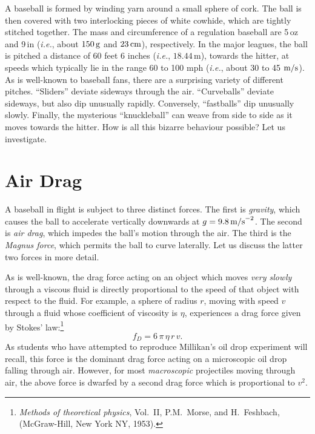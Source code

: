 A baseball is formed by winding yarn  around a small sphere of cork.
The ball is then covered with
two interlocking pieces of white cowhide, which are tightly stitched together.
The mass and circumference of a regulation baseball are 
5\,oz and 9\,in ({\em i.e.}, about
$150\,{\rm g}$ and $23\,{\rm cm}$), respectively.
In the major leagues, the ball is pitched a distance of 60
feet 6 inches ({\em i.e.}, $18.44$\,m), towards the hitter, at speeds
which typically lie in the range 60 to 100 {\rm mph} ({\em i.e.}, about 30 to 45
${\rm m/s}$). As is well-known to baseball fans,
there are a surprising  variety of different pitches. ``Sliders'' deviate
sideways through the air. ``Curveballs'' deviate sideways,
but also dip unusually rapidly. Conversely, ``fastballs'' dip unusually slowly. 
Finally, the mysterious ``knuckleball'' can
 weave from side to side as it moves towards the hitter. How is all this
bizarre behaviour possible? Let us investigate.

\section{Air Drag}\label{s42}
A baseball in flight is subject to three distinct forces. The first is {\em gravity}, which
causes the ball to accelerate vertically downwards at $g=9.8\,{\rm m/s}^{-2}$. The
second is {\em air drag}, which impedes the ball's motion through the air. The third
is the {\em Magnus force}, which permits the ball to curve laterally. Let us
discuss the latter two forces in more detail.

As is well-known, the drag force  acting on  an object which moves  {\em very
slowly}\/ through a viscous fluid is directly proportional to the speed 
 of that object with respect to the fluid. For example, a sphere
of radius $r$, moving with speed $v$ through a fluid whose coefficient of viscosity is $\eta$,
 experiences a drag force given by Stokes' law:\footnote{{\em Methods
of theoretical physics}, Vol.~II, P.M.~Morse, and H.~Feshbach, (McGraw-Hill, New York NY, 1953).}
\begin{equation}
f_D = 6\,\pi\,\eta\,r\,v.
\end{equation}
As students who have attempted to reproduce Millikan's oil drop experiment will
recall, this force is the dominant drag force acting on a microscopic oil drop falling through air. 
However, for most {\em macroscopic}\/ projectiles moving through air, the above force is dwarfed
by a second drag force which is proportional to $v^2$. 

